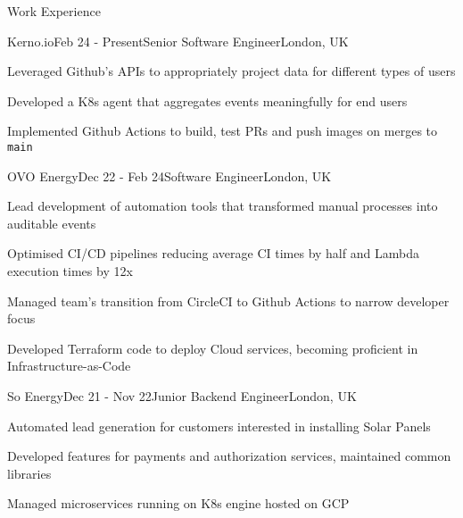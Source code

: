 \documentclass{resume} %
\begin{document}
\begin{rSection}{Work Experience}
    \begin{rSubsection}{Kerno.io}{Feb 24 - Present}{Senior Software Engineer}{London, UK}
    \item Leveraged Github's APIs to appropriately project data for different types of users    
    \item Developed a K8s agent that aggregates events meaningfully for end users
    \item Implemented Github Actions to build, test PRs and push images on merges to \texttt{main}
  \end{rSubsection}
  \begin{rSubsection}{OVO Energy}{Dec 22 - Feb 24}{Software Engineer}{London, UK}
    \item Lead development of automation tools that transformed manual processes into auditable events
    \item Optimised CI/CD pipelines reducing average CI times by half and Lambda execution times by 12x 
    \item Managed team’s transition from CircleCI to Github Actions to narrow developer focus
    \item Developed Terraform code to deploy Cloud services, becoming proficient in Infrastructure-as-Code
  \end{rSubsection}
  \begin{rSubsection}{So Energy}{Dec 21 - Nov 22}{Junior Backend Engineer}{London, UK}
    \item Automated lead generation for customers interested in installing Solar Panels
    \item Developed features for payments and authorization services, maintained common libraries
    \item Managed microservices running on K8s engine hosted on GCP
  \end{rSubsection}

\end{rSection}
\end{document}
